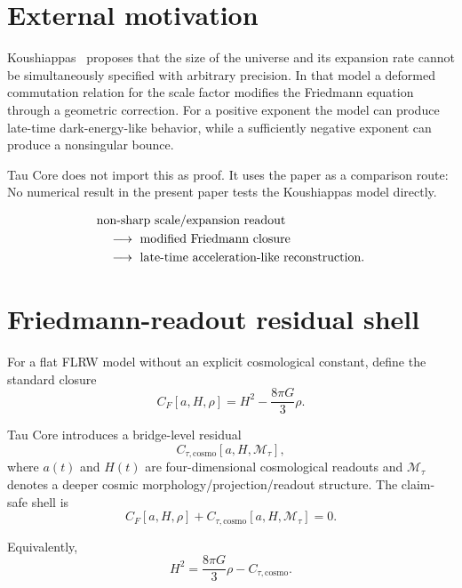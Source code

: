 \documentclass[11pt]{article}
\begin{document}
\section{External motivation}

Koushiappas~\cite{Koushiappas2026} proposes that the size of the universe and
its expansion rate cannot be simultaneously specified with arbitrary precision.
In that model a deformed commutation relation for the scale factor modifies the
Friedmann equation through a geometric correction. For a positive exponent the
model can produce late-time dark-energy-like behavior, while a sufficiently
negative exponent can produce a nonsingular bounce.

Tau Core does not import this as proof. It uses the paper as a comparison route:
No numerical result in the present paper tests the Koushiappas model directly.

\[
\begin{aligned}
&\hbox{non-sharp scale/expansion readout}\\
&\quad\longrightarrow\hbox{ modified Friedmann closure}\\
&\quad\longrightarrow\hbox{ late-time acceleration-like reconstruction}.
\end{aligned}
\]

\section{Friedmann-readout residual shell}

For a flat FLRW model without an explicit cosmological constant, define the
standard closure
\begin{equation}
C_F[a,H,\rho] = H^2 - \frac{8\pi G}{3}\rho.
\end{equation}

Tau Core introduces a bridge-level residual
\begin{equation}
C_{\tau,\mathrm{cosmo}}[a,H,\mathcal M_\tau],
\end{equation}
where \(a(t)\) and \(H(t)\) are four-dimensional cosmological readouts and
\(\mathcal M_\tau\) denotes a deeper cosmic morphology/projection/readout
structure. The claim-safe shell is
\begin{equation}
C_F[a,H,\rho]+C_{\tau,\mathrm{cosmo}}[a,H,\mathcal M_\tau]=0.
\end{equation}

Equivalently,
\begin{equation}
H^2=\frac{8\pi G}{3}\rho-C_{\tau,\mathrm{cosmo}}.
\end{equation}
\end{document}
